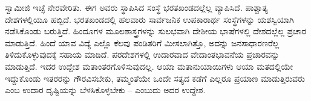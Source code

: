  ಸ್ವಾಮೀಜಿ ಇಚ್ಛೆ ನೇರವೇರಿತು. ಈಗ ಅವರು ಸ್ಥಾಪಿಸಿದ ಸಂಸ್ಥೆ ಭರತಖಂಡದಲ್ಲೆಲ್ಲ ವ್ಯಾಪಿಸಿದೆ. ಪಾಶ್ಚಾತ್ಯ ದೇಶಗಳಲ್ಲಿಯೂ ಹಬ್ಬಿದೆ. ಭರತಖಂಡದಲ್ಲಿ ಹಲವಾರು ಸಾರ್ವಜನಿಕ ಉಪಕಾರಾರ್ಥ ಸಂಸ್ಥೆಗಳನ್ನು ಯಶಸ್ವಿಯಾಗಿ ನಡೆಸಿಕೊಂಡು ಬರುತ್ತಿದೆ. ಹಿಂದೂಗಳ ಮೂಲಶಾಸ್ತ್ರಗಳನ್ನು ಸುಲಭವಾಗಿ ದೇಶೀಯ ಭಾಷೆಗಳಲ್ಲಿ ದೇಶದಲ್ಲೆಲ್ಲ ಪ್ರಚಾರ ಮಾಡುತ್ತಿದೆ. ಹಿಂದೆ ಯಾವ ವಿದ್ಯೆ ಎಲ್ಲೊ ಕೆಲವು ಪಂಡಿತರಿಗೆ ಮೀಸಲಾಗಿತ್ತೊ, ಅದನ್ನು ಜನಸಾಧಾರಣರೆಲ್ಲ ತಿಳಿದುಕೊಳ್ಳುವುದಕ್ಕೆ ಸಹಾಯ ಮಾಡಿದೆ. ಪರದೇಶಗಳಲ್ಲಿ ಉದಾರವಾದ ವೇದಾಂತಭಾವನೆಯ ಪ್ರಚಾರವನ್ನು ಮಾಡುತ್ತಿದೆ. ಇದರ ಉದ್ದೇಶ ಮತಾಂತರಗೊಳಿಸುವುದಲ್ಲ. ಆಯಾ ಮತಾನುಯಾಯಿಗಳು ಆಯಾ ಮತದಲ್ಲಿಯೇ ಇದ್ದುಕೊಂಡು ಇತರರನ್ನು ಗೌರವಿಸಬೇಕು, ತಮ್ಮಂತೆಯೇ ಒಂದೇ ಸತ್ಯದ ಕಡೆಗೆ ಎಲ್ಲರೂ ಪ್ರಯಾಣ ಮಾಡುತ್ತಿರುವರು ಎಂಬ ಉದಾರ ದೃಷ್ಟಿಯನ್ನು ಬೆಳಸಿಕೊಳ್ಳಬೇಕು – ಎಂಬುದು ಅದರ ಉದ್ದೇಶ. 


